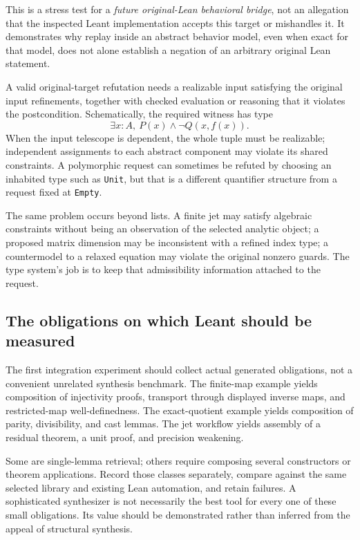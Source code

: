 \documentclass[11pt,letterpaper]{article}
\newcommand{\code}[1]{\nolinkurl{#1}}
\theoremstyle{remark}
\begin{document}
This is a stress test for a \emph{future original-Lean behavioral bridge}, not
an allegation that the inspected Leant implementation accepts this target or
mishandles it. It demonstrates why replay inside an abstract behavior model,
even when exact for that model, does not alone establish a negation of an
arbitrary original Lean statement.

A valid original-target refutation needs a realizable input satisfying the
original input refinements, together with checked evaluation or reasoning that
it violates the postcondition. Schematically, the required witness has type
\[
 \exists x:A,\ P(x)\land\neg Q(x,f(x)).
\]
When the input telescope is dependent, the whole tuple must be realizable;
independent assignments to each abstract component may violate its shared
constraints. A polymorphic request can sometimes be refuted by choosing an
inhabited type such as \code{Unit}, but that is a different quantifier structure
from a request fixed at \code{Empty}.

The same problem occurs beyond lists. A finite jet may satisfy algebraic
constraints without being an observation of the selected analytic object;
a proposed matrix dimension may be inconsistent with a refined index type;
a countermodel to a relaxed equation may violate the original nonzero guards.
The type system's job is to keep that admissibility information attached to
the request.

\subsection{The obligations on which Leant should be measured}
The first integration experiment should collect actual generated obligations,
not a convenient unrelated synthesis benchmark. The finite-map example yields
composition of injectivity proofs, transport through displayed inverse maps,
and restricted-map well-definedness. The exact-quotient example yields
composition of parity, divisibility, and cast lemmas. The jet workflow yields
assembly of a residual theorem, a unit proof, and precision weakening.

Some are single-lemma retrieval; others require composing several constructors
or theorem applications. Record those classes separately, compare against the
same selected library and existing Lean automation, and retain failures.
A sophisticated synthesizer is not necessarily the best tool for every one of
these small obligations. Its value should be demonstrated rather than inferred
from the appeal of structural synthesis.
\end{document}
